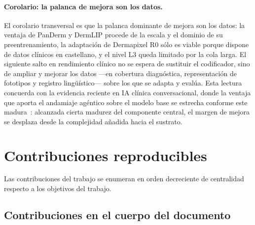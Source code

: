 \paragraph{Corolario: la palanca de mejora son los datos.}
El corolario transversal es que la palanca dominante de mejora son los
datos: la ventaja de PanDerm y DermLIP procede de la escala y el dominio
de su preentrenamiento, la adaptación de Dermapixel R0 sólo es viable
porque dispone de datos clínicos en castellano, y el nivel L3 queda
limitado por la cola larga. El siguiente salto en rendimiento clínico no
se espera de sustituir el codificador, sino de ampliar y mejorar los
datos ---en cobertura diagnóstica, representación de fototipos y registro
lingüístico--- sobre los que se adapta y evalúa. Esta lectura concuerda con
la evidencia reciente en IA clínica conversacional, donde la ventaja que
aporta el andamiaje agéntico sobre el modelo base se estrecha conforme este
madura~\cite{amie2026}: alcanzada cierta madurez del componente central, el
margen de mejora se desplaza desde la complejidad añadida hacia el sustrato.

\section{Contribuciones reproducibles}
\label{sec:contribuciones}

Las contribuciones del trabajo se enumeran en orden decreciente
de centralidad respecto a los objetivos del trabajo.

\subsection{Contribuciones en el cuerpo del documento}
\label{sec:contrib-cuerpo}


